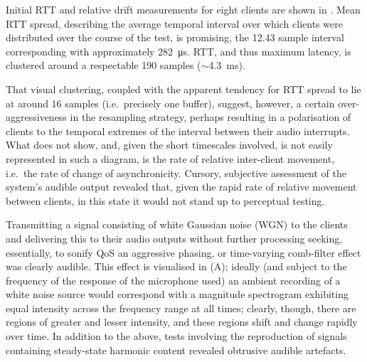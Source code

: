 Initial RTT and relative drift measurements for eight clients are shown in
.
Mean RTT spread, describing the average temporal interval over which clients
were distributed over the course of the test, is promising, the 12.43 sample
interval corresponding with approximately \qty{282}{\us}.
RTT, and thus maximum latency, is clustered around a respectable 190 samples
($\sim$\qty{4.3}{\ms}).

That visual clustering, coupled with the apparent tendency for RTT spread to
lie at around 16 samples (i.e.\ precisely one buffer), suggest, however, a
certain over-aggressiveness in the resampling strategy, perhaps resulting in a
polarisation of clients to the temporal extremes of the interval between their
audio interrupts.
What  does not show, and, given the short timescales
involved, is not easily represented in such a diagram, is the rate of relative
inter-client movement, i.e.\ the rate of change of asynchronicity.
Cursory, subjective assessment of the system's audible output revealed that,
given the rapid rate of relative movement between clients, in this state it
would not stand up to perceptual testing.

Transmitting a signal consisting of white Gaussian noise (WGN) to the clients
and delivering this to their audio outputs without further processing
\textemdash{} seeking, essentially, to sonify QoS \textemdash{} an
aggressive phasing, or time-varying comb-filter effect was clearly audible.
This effect is visualised in (A); ideally (and
subject to the frequency of the response of the microphone used) an ambient
recording of a white noise source would correspond with a magnitude spectrogram
exhibiting equal intensity across the frequency range at all times; clearly,
though, there are regions of greater and lesser intensity, and these regions
shift and change rapidly over time.
In addition to the above, tests involving the reproduction of signals
containing steady-state harmonic content revealed obtrusive audible artefacts.


